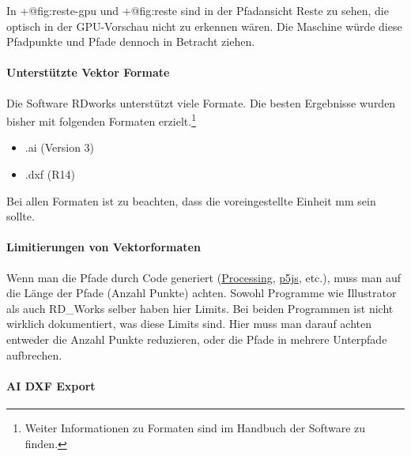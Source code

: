 \documentclass[]{article}
\providecommand{\tightlist}{%
  \setlength{\itemsep}{0pt}\setlength{\parskip}{0pt}}
\let\oldparagraph\paragraph
\renewcommand{\paragraph}[1]{\oldparagraph{#1}\mbox{}}
\begin{document}
In +@fig:reste-gpu und +@fig:reste sind in der Pfadansicht Reste zu
sehen, die optisch in der GPU-Vorschau nicht zu erkennen wären. Die
Maschine würde diese Pfadpunkte und Pfade dennoch in Betracht ziehen.

\hypertarget{unterstuxfctzte-vektor-formate}{%
\paragraph{Unterstützte Vektor
Formate}\label{unterstuxfctzte-vektor-formate}}

Die Software RDworks unterstützt viele Formate. Die besten Ergebnisse
wurden bisher mit folgenden Formaten erzielt.\footnote{Weiter
  Informationen zu Formaten sind im Handbuch der Software zu finden.}

\begin{itemize}
\tightlist
\item
  .ai (Version 3)
\item
  .dxf (R14)
\end{itemize}

Bei allen Formaten ist zu beachten, dass die voreingestellte Einheit mm
sein sollte.

\hypertarget{limitierungen-von-vektorformaten}{%
\paragraph{Limitierungen von
Vektorformaten}\label{limitierungen-von-vektorformaten}}

Wenn man die Pfade durch Code generiert
(\href{https://processing.org/}{Processing},
\href{https://p5js.org/}{p5js}, etc.), muss man auf die Länge der Pfade
(Anzahl Punkte) achten. Sowohl Programme wie Illustrator als auch
RD\_Works selber haben hier Limits. Bei beiden Programmen ist nicht
wirklich dokumentiert, was diese Limits sind. Hier muss man darauf
achten entweder die Anzahl Punkte reduzieren, oder die Pfade in mehrere
Unterpfade aufbrechen.

\hypertarget{ai-dxf-export}{%
\paragraph{AI DXF Export}\label{ai-dxf-export}}
\end{document}
